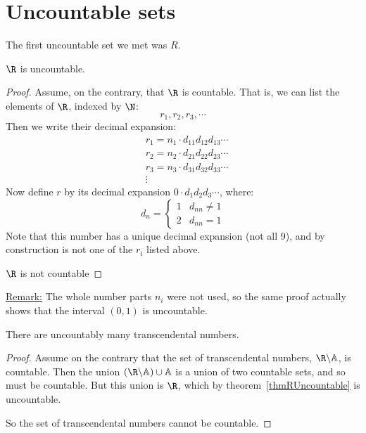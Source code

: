 \documentclass[../Main.tex]{subfiles}
\begin{document}
\section{Uncountable sets}
The first uncountable set we met was $R$.
\begin{theorem}
    $\R$ is uncountable.
    \label{thmRUncountable}
\end{theorem}
\begin{proof}
    Assume, on the contrary, that $\R$ is countable. That is, we can list the elements of $\R$, indexed by $\N$:
    \begin{equation*}
        r_1, r_2, r_3, \cdots
    \end{equation*}
    Then we write their decimal expansion:
    \begin{align*}
        &r_1 = n_1 \cdot d_{11} d_{12} d_{13} \cdots \\
        &r_2 = n_2 \cdot d_{21} d_{22} d_{23} \cdots \\
        &r_3 = n_3 \cdot d_{31} d_{32} d_{33} \cdots \\
        &\vdots
    \end{align*}
    Now define $r$ by its decimal expansion $0\cdot d_1 d_2 d_3 \cdots$, where:
    \begin{equation*}
        d_n=
        \begin{cases}
            1 & d_{nn} \neq 1 \\
            2 & d_{nn} = 1
        \end{cases}
    \end{equation*}
    Note that this number has a unique decimal expansion (not all 9), and by construction is not one of the $r_i$ listed above.\contradiction\par
    $\R$ is not countable
\end{proof}
\underline{Remark:} The whole number parts $n_i$ were not used, so the same proof actually shows that the interval $(0,1)$ is uncountable.
\begin{corollary}
    \label{corTranscUncountable}
    There are uncountably many transcendental numbers.
\end{corollary}
\begin{proof}
    Assume on the contrary that the set of transcendental numbers, $\R \backslash \A$, is countable.
    Then the union $(\R \backslash \A) \cup \A$ is a union of two countable sets, and so must be countable. But this union is $\R$, which by theorem~\ref{thmRUncountable} is uncountable. \contradiction\par
    So the set of transcendental numbers cannot be countable.
\end{proof}
\end{document}
